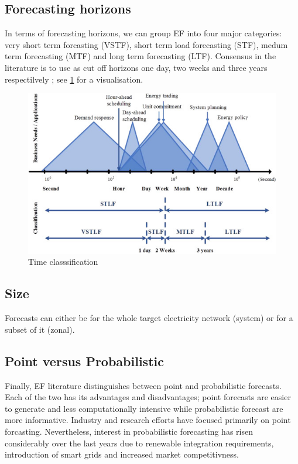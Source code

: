 \subsection{Forecasting horizons}\label{cls_time}
In terms of forecasting horizons, we can group EF into four major categories: very short term forcasting (VSTF), short term load forecasting (STF), medum term forecasting (MTF) and long term forecasting (LTF). Consensus in the literature is to use as cut off horizons one day, two weeks and three years respectilvely \cite{hong_phd}; see \ref{fig:time} for a visualisation. 
\begin{figure}
  \includegraphics[width=\textwidth]{images/time.jpg}
  \caption{Time classsification \cite{prob_elf}}
  \label{fig:time}
\end{figure}


\subsection{Size}
Forecasts can either be for the whole target electricity network (system) or for a subset of it (zonal).

\subsection{Point versus Probabilistic}\label{cls_pp}
Finally, EF literature distinguishes between point and probabilistic forecasts. Each of the two has its advantages and disadvantages; point forecasts are easier to generate and less computationally intensive while probabilistic forecast are more informative. Industry and research efforts have focused primarily on point forcasting. Nevertheless, interest in probabilistic forecasting has risen considerably over the last years due to renewable integration requirements, introduction of smart grids and increased market competitivness.
